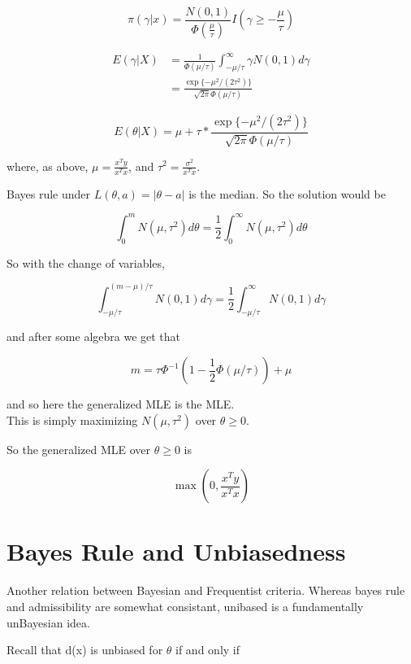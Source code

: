 \documentclass[11pt,fleqn]{book} %
\begin{document}
\begin{example}
		$$\pi(\gamma | x) = \frac{N(0,1)}{\Phi(\frac{\mu}{\tau})} I (\gamma \geq - \frac{\mu}{\tau}) $$

		\begin{align*}
			E(\gamma|X) &= \frac{1}{\Phi(\mu/ \tau)} \int^\infty_{- \mu/\tau} \gamma N(0, 1) d\gamma \\
				&= \frac{\exp\{- \mu^2 / (2\tau^2)\}}{\sqrt{2 \pi} \Phi(\mu/ \tau)}
		\end{align*}

		$$E(\theta | X) = \mu + \tau * \frac{\exp\{- \mu^2 / (2\tau^2)\}}{\sqrt{2 \pi} \Phi(\mu/ \tau)} $$

where, as above,  $\mu = \frac{x^Ty}{x^T x}$, and $\tau^2 = \frac{\sigma^2}{x^T x}$. \\



 \end{example} 

 Bayes rule under $L(\theta, a ) = |\theta - a|$ is the median. So the solution would be 

 		$$\int^m_0 N(\mu, \tau^2) d\theta = \frac{1}{2} \int^\infty_0 N(\mu, \tau^2) d\theta $$

 So with the change of variables, 

 		$$\int^{(m-\mu)/ \tau}_{-\mu/ \tau} N(0, 1) d\gamma = \frac{1}{2} \int^\infty_{- \mu/ \tau} N(0, 1) d\gamma $$

 and after some algebra we get that 

 		$$m = \tau \Phi^{-1}(1 - \frac{1}{2}\Phi(\mu / \tau)) + \mu $$

 and so here the generalized MLE is the MLE. \\

 This is simply maximizing $N(\mu, \tau^2)$ over $\theta \geq 0$. 

So the generalized MLE over $\theta \geq 0$ is 

		$$\max(0, \frac{x^T y}{x^T x}) $$

\section{Bayes Rule and Unbiasedness}

Another relation between Bayesian and Frequentist criteria. Whereas bayes rule and admissibility are somewhat consistant, unibased is a fundamentally unBayesian idea. 

Recall that d(x) is unbiased for $\theta$ if and only if 
\end{document}
